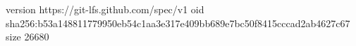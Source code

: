 version https://git-lfs.github.com/spec/v1
oid sha256:b53a148811779950eb54c1aa3e317e409bb689e7bc50f8415cccad2ab4627c67
size 26680
